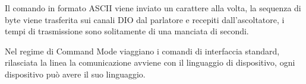 Il comando in formato ASCII viene inviato un carattere alla volta, la sequenza
di byte viene trasferita sui canali DIO dal parlatore e recepiti
dall'ascoltatore, i tempi di trasmissione sono solitamente di una manciata di
secondi.

Nel regime di Command Mode viaggiano i comandi di interfaccia standard,
rilasciata la linea la comunicazione avviene con il linguaggio di dispositivo,
ogni dispositivo può avere il suo linguaggio.






